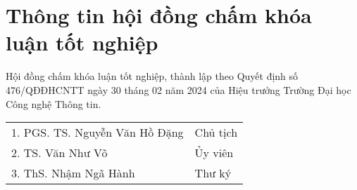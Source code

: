 \chapter*{\centering\Large{Thông tin hội đồng chấm khóa luận tốt nghiệp}}
Hội đồng chấm khóa luận tốt nghiệp, thành lập theo Quyết định số 476/QĐĐHCNTT ngày 30 tháng 02 năm 2024 của Hiệu trưởng Trường Đại học Công nghệ
Thông tin.
\begin{center}
    \begin{tabular}{ p{} p{}} 
        1. PGS. TS. Nguyễn Văn Hồ Đặng  & Chủ tịch \\
        2. TS. Văn Như Võ   & Ủy viên \\ 
        3. ThS. Nhậm Ngã Hành & Thư ký \\ 
    \end{tabular} 
\end{center}


